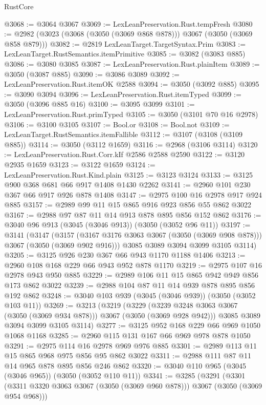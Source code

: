 \begin{lexlean}{RustCore}
\begin{coremodule}
@3068 := @3064 @3067
@3069 := LexLeanPreservation.Rust.tempFresh
@3080 := @2982 (@3023 (@3068 (@3050 (@3069 @868 @878))) @3067 (@3050 (@3069 @858 @879)))
@3082 := @2819 LexLeanTarget.TargetSyntax.Prim
@3083 := LexLeanTarget.RustSemantics.itemPrimitive
@3085 := @3082 (@3083 @885)
@3086 := @3080 @3085
@3087 := LexLeanPreservation.Rust.plainItem
@3089 := @3050 (@3087 @885)
@3090 := @3086 @3089
@3092 := LexLeanPreservation.Rust.itemOK @2588
@3094 := @3050 (@3092 @885)
@3095 := @3090 @3094
@3096 := LexLeanPreservation.Rust.itemTyped
@3099 := @3050 (@3096 @885 @16)
@3100 := @3095 @3099
@3101 := LexLeanPreservation.Rust.primTyped
@3105 := @3050 (@3101 @70 @16 @2978)
@3106 := @3100 @3105
@3107 := Bool.or
@3108 := Bool.not
@3109 := LexLeanTarget.RustSemantics.itemFallible
@3112 := @3107 (@3108 (@3109 @885))
@3114 := @3050 (@3112 @1659)
@3116 := @2968 (@3106 @3114)
@3120 := LexLeanPreservation.Rust.Corr.kIf @2586 @2588 @2590
@3122 := @3120 @2935 @1659
@3123 := @3122 @1659
@3124 := LexLeanPreservation.Rust.Kind.plain
@3125 := @3123 @3124
@3133 := @3125 @900 @368 @681 @66 @917 @1408 @1430 @2262
@3141 := @2960 @101 @230 @367 @66 @917 @926 @878 @1408
@3147 := @2975 @100 @16 @2978 @917 @924 @885
@3157 := @2989 @99 @11 @15 @865 @916 @923 @856 @55 @862 @3022
@3167 := @2988 @97 @87 @11 @14 @913 @878 @895 @856 @152 @862
@3176 := @3040 @96 @913 (@3045 (@3046 @913)) (@3050 (@3052 @96 @11))
@3197 := @3141
    (@3147
      (@3157 (@3167 @3176 @3063 @3067 (@3050 (@3069 @908 @878))) @3067 (@3050 (@3069 @902 @916)))
      @3085
      @3089
      @3094
      @3099
      @3105
      @3114)
@3205 := @3125 @926 @230 @367 @66 @943 @1170 @1188 @1406
@3213 := @2960 @108 @168 @229 @66 @943 @952 @878 @1170
@3219 := @2975 @107 @16 @2978 @943 @950 @885
@3229 := @2989 @106 @11 @15 @865 @942 @949 @856 @173 @862 @3022
@3239 := @2988 @104 @87 @11 @14 @939 @878 @895 @856 @192 @862
@3248 := @3040 @103 @939 (@3045 (@3046 @939)) (@3050 (@3052 @103 @11))
@3269 := @3213
    (@3219
      (@3229 (@3239 @3248 @3063 @3067 (@3050 (@3069 @934 @878))) @3067 (@3050 (@3069 @928 @942)))
      @3085
      @3089
      @3094
      @3099
      @3105
      @3114)
@3277 := @3125 @952 @168 @229 @66 @969 @1050 @1068 @1168
@3285 := @2960 @115 @131 @167 @66 @969 @978 @878 @1050
@3291 := @2975 @114 @16 @2978 @969 @976 @885
@3301 := @2989 @113 @11 @15 @865 @968 @975 @856 @95 @862 @3022
@3311 := @2988 @111 @87 @11 @14 @965 @878 @895 @856 @246 @862
@3320 := @3040 @110 @965 (@3045 (@3046 @965)) (@3050 (@3052 @110 @11))
@3341 := @3285
    (@3291
      (@3301 (@3311 @3320 @3063 @3067 (@3050 (@3069 @960 @878))) @3067 (@3050 (@3069 @954 @968)))

\end{coremodule}
\end{lexlean}
